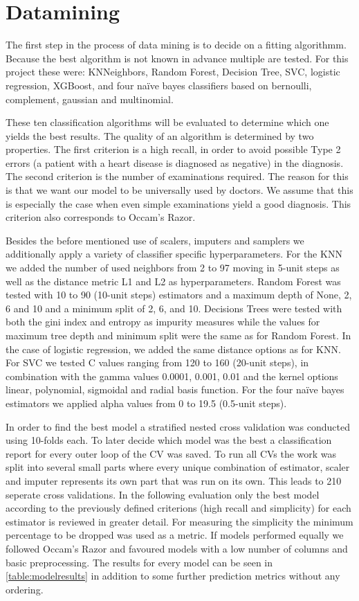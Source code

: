 \section{Datamining} \label{sec:datamining}
The first step in the process of data mining is to decide on a fitting algorithmm. Because the best algorithm is not known in advance multiple are tested. For this project these were: KNNeighbors, Random Forest, Decision Tree, SVC, logistic regression, XGBoost, and four naïve bayes classifiers based on bernoulli, complement, gaussian  and multinomial.

These ten classification algorithms will be evaluated to determine which one yields the best results. The quality of an algorithm is determined by two properties. The first criterion is a high recall, in order to avoid possible Type 2 errors (a patient with a heart disease is diagnosed as negative) in the diagnosis. The second criterion is the number of examinations required. The reason for this is that we want our model to be universally used by doctors. We assume that this is especially the case when even simple examinations yield a good diagnosis. This criterion also corresponds to Occam’s Razor.

Besides the before mentioned use of scalers, imputers and samplers we additionally apply a variety of classifier specific hyperparameters. For the KNN we added the number of used neighbors from 2 to 97 moving in 5-unit steps as well as the distance metric L1 and L2 as hyperparameters. Random Forest was tested with 10 to 90 (10-unit steps) estimators and a maximum depth of None, 2, 6 and 10 and a minimum split of 2, 6, and 10. Decisions Trees were tested with both the gini index and entropy as impurity measures while the values for maximum tree depth and minimum split were the same as for Random Forest. In the case of logistic regression, we added the same distance options as for KNN. For SVC we tested C values ranging from 120 to 160 (20-unit steps), in combination with the gamma values 0.0001, 0.001, 0.01 and the kernel options linear, polynomial, sigmoidal and radial basis function. For the four naïve bayes estimators we applied alpha values from 0 to 19.5 (0.5-unit steps).

In order to find the best model a stratified nested cross validation was conducted using 10-folds each. To later decide which model was the best a classification report for every outer loop of the CV was saved. To run all CVs the work was split into several small parts where every unique combination of estimator, scaler and imputer represents its own part that was run on its own. This leads to 210 seperate cross validations. In the following evaluation only the best model according to the previously defined criterions (high recall and simplicity) for each estimator is reviewed in greater detail. For measuring the simplicity the minimum percentage to be dropped was used as a metric. If models performed equally we followed Occam's Razor and favoured models with a low number of columns and basic preprocessing. The results for every model can be seen in \cref{table:modelresults} in addition to some further prediction metrics without any ordering.


